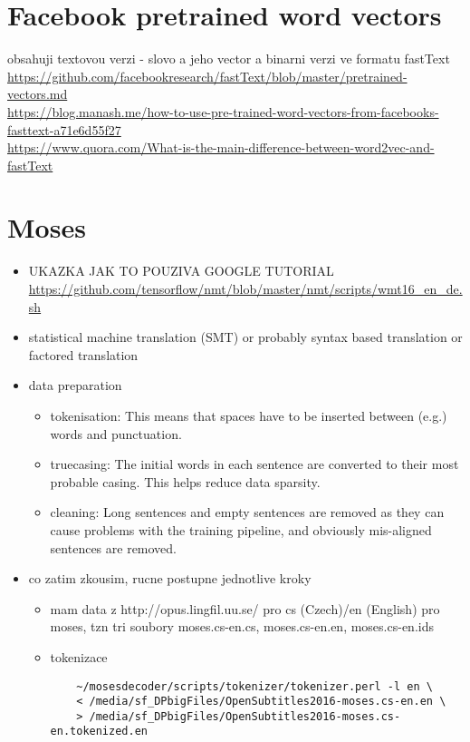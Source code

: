 \section{Facebook pretrained word vectors}
obsahuji textovou verzi - slovo a jeho vector a binarni verzi ve formatu fastText
\url{https://github.com/facebookresearch/fastText/blob/master/pretrained-vectors.md}\\
\url{https://blog.manash.me/how-to-use-pre-trained-word-vectors-from-facebooks-fasttext-a71e6d55f27}\\
\url{https://www.quora.com/What-is-the-main-difference-between-word2vec-and-fastText}

\section{Moses}
\begin{itemize} \label{moses}
  \item UKAZKA JAK TO POUZIVA GOOGLE TUTORIAL \url{https://github.com/tensorflow/nmt/blob/master/nmt/scripts/wmt16_en_de.sh}
  \item statistical machine translation (SMT) or probably syntax based translation or factored translation
  \item data preparation
  \begin{itemize}
    \item tokenisation: This means that spaces have to be inserted between (e.g.) words and punctuation.
    \item truecasing: The initial words in each sentence are converted to their most probable casing. This helps reduce data sparsity.
    \item cleaning: Long sentences and empty sentences are removed as they can cause problems with the training pipeline, and obviously mis-aligned sentences are removed.
  \end{itemize}
  \item co zatim zkousim, rucne postupne jednotlive kroky
  \begin{itemize}
    \item mam data z http://opus.lingfil.uu.se/ pro cs (Czech)/en (English) pro moses, tzn tri soubory moses.cs-en.cs, moses.cs-en.en, moses.cs-en.ids
    \item tokenizace
    \begin{lstlisting}
    ~/mosesdecoder/scripts/tokenizer/tokenizer.perl -l en \
    < /media/sf_DPbigFiles/OpenSubtitles2016-moses.cs-en.en \
    > /media/sf_DPbigFiles/OpenSubtitles2016-moses.cs-en.tokenized.en

\end{lstlisting}
\end{itemize}
\end{itemize}
